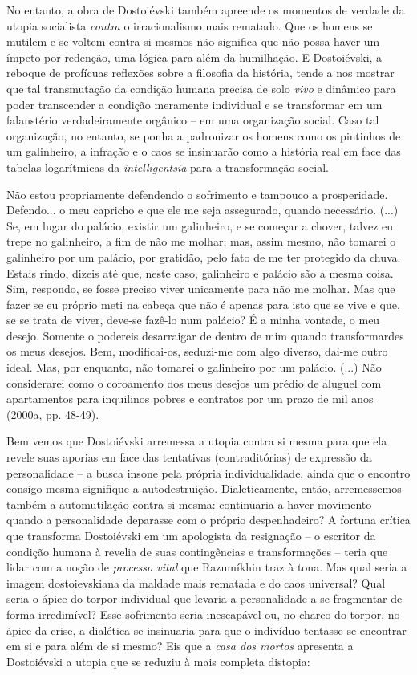 No entanto, a obra de Dostoiévski também apreende os momentos de verdade
da utopia socialista \emph{contra} o irracionalismo mais rematado. Que
os homens se mutilem e se voltem contra si mesmos não significa que não
possa haver um ímpeto por redenção, uma lógica para além da humilhação.
E Dostoiévski, a reboque de profícuas reflexões sobre a filosofia da
história, tende a nos mostrar que tal transmutação da condição humana
precisa de solo \emph{vivo} e dinâmico para poder transcender a condição
meramente individual e se transformar em um falanstério verdadeiramente
orgânico -- em uma organização social. Caso tal organização, no entanto,
se ponha a padronizar os homens como os pintinhos de um galinheiro, a
infração e o caos se insinuarão como a história real em face das tabelas
logarítmicas da \emph{intelligentsia} para a transformação social.

Não estou propriamente defendendo o sofrimento e tampouco a
prosperidade. Defendo... o meu capricho e que ele me seja assegurado,
quando necessário. (...) Se, em lugar do palácio, existir um galinheiro,
e se começar a chover, talvez eu trepe no galinheiro, a fim de não me
molhar; mas, assim mesmo, não tomarei o galinheiro por um palácio, por
gratidão, pelo fato de me ter protegido da chuva. Estais rindo, dizeis
até que, neste caso, galinheiro e palácio são a mesma coisa. Sim,
respondo, se fosse preciso viver unicamente para não me molhar. Mas que
fazer se eu próprio meti na cabeça que não é apenas para isto que se
vive e que, se se trata de viver, deve-se fazê-lo num palácio? É a minha
vontade, o meu desejo. Somente o podereis desarraigar de dentro de mim
quando transformardes os meus desejos. Bem, modificai-os, seduzi-me com
algo diverso, dai-me outro ideal. Mas, por enquanto, não tomarei o
galinheiro por um palácio. (...) Não considerarei como o coroamento dos
meus desejos um prédio de aluguel com apartamentos para inquilinos
pobres e contratos por um prazo de mil anos (2000a, pp. 48-49).

Bem vemos que Dostoiévski arremessa a utopia contra si mesma para que
ela revele suas aporias em face das tentativas (contraditórias) de
expressão da personalidade -- a busca insone pela própria
individualidade, ainda que o encontro consigo mesma signifique a
autodestruição. Dialeticamente, então, arremessemos também a
automutilação contra si mesma: continuaria a haver movimento quando a
personalidade deparasse com o próprio despenhadeiro? A fortuna crítica
que transforma Dostoiévski em um apologista da resignação -- o escritor
da condição humana à revelia de suas contingências e transformações --
teria que lidar com a noção de \emph{processo vital} que Razumíkhin traz
à tona. Mas qual seria a imagem dostoievskiana da maldade mais rematada
e do caos universal? Qual seria o ápice do torpor individual que levaria
a personalidade a se fragmentar de forma irredimível? Esse sofrimento
seria inescapável ou, no charco do torpor, no ápice da crise, a
dialética se insinuaria para que o indivíduo tentasse se encontrar em si
e para além de si mesmo? Eis que a \emph{casa dos mortos} apresenta a
Dostoiévski a utopia que se reduziu à mais completa distopia:

